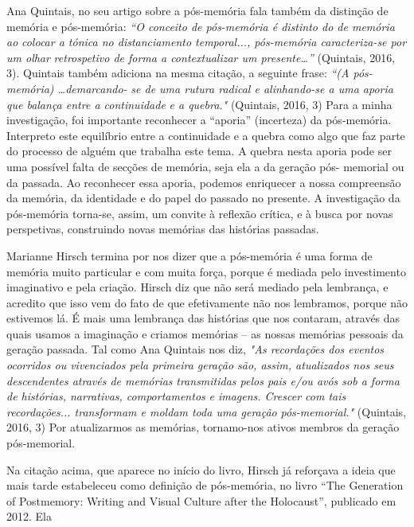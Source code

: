 \documentclass{article}
\begin{document}
Ana  Quintais,  no  seu  artigo  sobre  a  pós-memória  fala  também  da  distinção  de 
memória  e  pós-memória:  \textit{“O  conceito  de  pós-memória  é  distinto  do  de  memória  ao }
\textit{colocar a tónica no distanciamento temporal..., pós-memória caracteriza-se por um olhar }
\textit{retrospetivo  de  forma  a  contextualizar  um  presente…”}  (Quintais,  2016,  3).  Quintais 
também adiciona na mesma citação, a seguinte frase: \textit{“(A pós-memória) …demarcando-}
\textit{se de uma rutura radical e alinhando-se a uma aporia que balança entre a continuidade }
\textit{e a quebra."} (Quintais, 2016, 3) Para a minha investigação, foi importante reconhecer a 
“aporia” (incerteza) da pós-memória. Interpreto este equilíbrio entre a continuidade e a 
quebra como algo que faz parte do processo de alguém que trabalha este tema. A quebra 
nesta aporia pode ser uma possível falta de secções de memória, seja ela a da geração pós-
memorial  ou  da  passada.  Ao  reconhecer  essa  aporia,  podemos  enriquecer  a  nossa 
compreensão  da  memória,  da  identidade  e  do  papel  do  passado  no  presente.  A 
investigação da pós-memória torna-se, assim, um convite à reflexão crítica, e à busca por 
novas perspetivas, construindo novas memórias das histórias passadas.  
 
Marianne  Hirsch  termina  por  nos  dizer  que  a  pós-memória  é  uma  forma  de 
memória  muito  particular  e  com  muita  força,  porque  é  mediada  pelo  investimento 
imaginativo e pela criação. Hirsch diz que não será mediado pela lembrança, e acredito 
que isso vem do fato de que efetivamente não nos lembramos, porque não estivemos lá. 
É  mais  uma  lembrança  das  histórias  que  nos  contaram,  através  das  quais  usamos  a 
imaginação e criamos memórias – as nossas memórias pessoais da geração passada. Tal 
como Ana Quintais nos diz, \textit{"As recordações dos eventos ocorridos ou vivenciados pela }
\textit{primeira  geração  são,  assim,  atualizados  nos  seus  descendentes  através  de  memórias }
\textit{transmitidas pelos pais e/ou avós sob a forma de histórias, narrativas, comportamentos }
\textit{e imagens. Crescer com tais recordações... transformam e moldam toda uma geração }
\textit{pós-memorial."} (Quintais, 2016, 3) Por atualizarmos as memórias, tornamo-nos ativos 
membros da geração pós-memorial.  
 
Na citação acima, que aparece no início do livro, Hirsch já reforçava a ideia que 
mais  tarde  estabeleceu  como  definição  de  pós-memória,  no  livro  “The  Generation  of 
Postmemory: Writing and Visual Culture after the Holocaust”, publicado em 2012. Ela 
 
\end{document}
